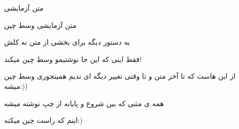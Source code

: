 \documentclass{article}
\begin{document}
متن آزمایشی

\begin{center}
	متن آزمایشی وسط چین
\end{center}

یه دستور دیگه برای بخشی از متن نه کلش


\centerline{فقط اینی که این جا نوشتیمو وسط چین میکند!}



\centering
از این هاست که تا آخر متن و تا وقتی تغییر دیگه ای ندیم همینجوری وسط چین میشه:))

\begin{flushleft}
	همه ی متنی که بین شروع و پایانه از چپ نوشته میشه
\end{flushleft}


\begin{flushright}
	اینم که راست چین میکنه:)
\end{flushright}
\end{document}
